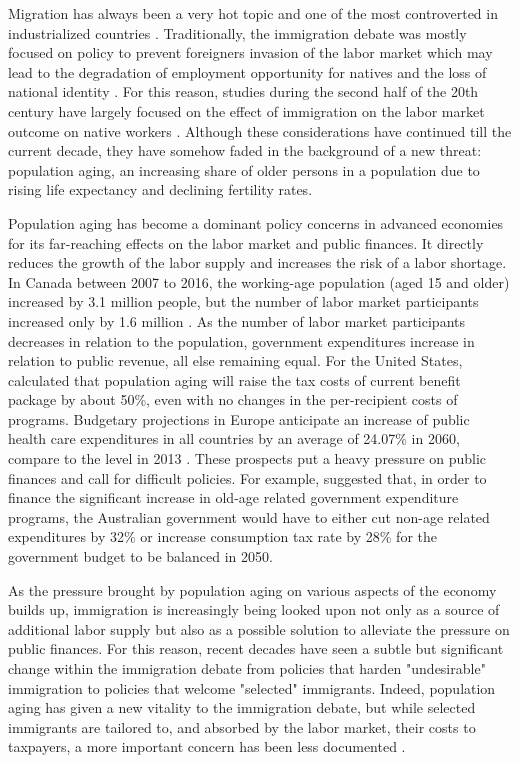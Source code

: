 Migration has always been a very hot topic and one of the most controverted in industrialized countries \citep{Marois:2020je}.
Traditionally, the immigration debate was mostly focused on policy to prevent foreigners invasion of the labor market which may lead to the degradation of employment opportunity for natives \citep{Fusaro:2018wi} and the loss of national identity \citep{Castles:2012vr}.
For this reason, studies during the second half of the 20th century have largely focused on the effect of immigration on the labor market outcome on native workers \citep{Piche:2013ir}.
Although these considerations have continued till the current decade, they have somehow faded in the background of a new threat: population aging, an increasing share of older persons in a population due to rising life expectancy and declining fertility rates.

\vspace{0.7em}\par
Population aging has become a dominant policy concerns in advanced economies for its far-reaching effects on the labor market and public finances.
It directly reduces the growth of the labor supply and increases the risk of a labor shortage.
In Canada between 2007 to 2016, the working-age population (aged 15 and older) increased by 3.1 million people, but the number of labor market participants increased only by 1.6 million \citep{Fields:2017wa}.
As the number of labor market participants decreases in relation to the population, government expenditures increase in relation to public revenue, all else remaining equal.
For the United States, \citet{Lee:bKjc_XK_} calculated that population aging will raise the tax costs of current benefit package by about 50\%, even with no changes in the per-recipient costs of programs.
Budgetary projections in Europe anticipate an increase of public health care expenditures in all countries by an average of 24.07\% in 2060, compare to the level in 2013 \citep{Zokalj:2016bq}.
These prospects put a heavy pressure on public finances and call for difficult policies.
For example, \citet{Kudrna:2015dr} suggested that, in order to finance the significant increase in old-age related government expenditure programs, the Australian government would have to either cut non-age related expenditures by 32\% or increase consumption tax rate by 28\% for the government budget to be balanced in 2050.

\vspace{0.7em}\par
As the pressure brought by population aging on various aspects of the economy builds up, immigration is increasingly being looked upon not only as a source of additional labor supply but also as a possible solution to alleviate the pressure on public finances.
For this reason, recent decades have seen a subtle but significant change within the immigration debate from policies that harden "undesirable" immigration to policies that welcome "selected" immigrants.
Indeed, population aging has given a new vitality to the immigration debate, but while selected immigrants are tailored to, and absorbed by the labor market, their costs to taxpayers, a more important concern has been less documented \citep{Dustmann:2007fl}.

